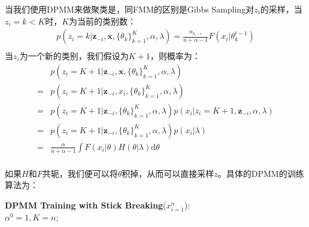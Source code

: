 当我们使用DPMM来做聚类是，同FMM的区别是Gibbs Sampling对$z_i$的采样，当$z_i=k<K$时，$K$为当前的类别数：
\begin{displaymath}
\begin{split}
p(z_i=k | \mathbf{z}_{-i}, \mathbf{x}, \{\theta_k\}_{k=1}^{K}, \alpha, \lambda) = \frac{n_{k, -i}}{n+\alpha -1} F(x_i|\theta_{k}^{t-1})\\
\end{split}
\end{displaymath}
当$z_i$为一个新的类别，我们假设为$K+1$，则概率为：
\begin{displaymath}
\begin{split}
&p(z_i=K+1 | \mathbf{z}_{-i}, \mathbf{x}, \{\theta_k\}_{k=1}^{K}, \alpha, \lambda)\\
=&p(z_i=K+1 | \mathbf{z}_{-i}, x_i, \{\theta_k\}_{k=1}^{K}, \alpha, \lambda)\\
=&p(z_i=K+1 | \mathbf{z}_{-i}, \{\theta_k\}_{k=1}^{K}, \alpha, \lambda) p(x_i | z_i=K+1, \mathbf{z}_{-i}, \alpha, \lambda)\\
=&p(z_i=K+1 | \mathbf{z}_{-i}, \{\theta_k\}_{k=1}^{K}, \alpha, \lambda) p(x_i|\lambda)\\
=&\frac{\alpha}{n+\alpha-1} \int F(x_i|\theta)H(\theta|\lambda) \mathrm{d} \theta\\
\end{split}
\end{displaymath}

如果$H$和$F$共轭，我们便可以将$\theta$积掉，从而可以直接采样$z$。具体的DPMM的训练算法为：

\begin{minipage}{0.8\textwidth}\centering
\begin{algorithm}[H]
\textbf{DPMM Training with Stick Breaking}($x_{i=1}^{n}$):\\
$\alpha^{0} =1, K=n$;\\
\end{algorithm}
\end{minipage}
